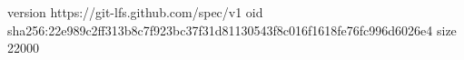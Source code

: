 version https://git-lfs.github.com/spec/v1
oid sha256:22e989c2ff313b8c7f923bc37f31d81130543f8c016f1618fe76fc996d6026e4
size 22000
